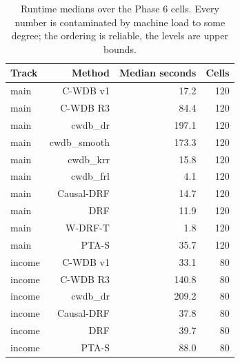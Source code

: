\begin{table}[htbp]
\centering
\caption{Runtime medians over the Phase 6 cells. Every number is contaminated by machine load to some degree; the ordering is reliable, the levels are upper bounds.}
\label{tab:p6-cost}
\small
\begin{tabular}{@{}lrrr@{}}
\toprule
Track & Method & Median seconds & Cells \\ 
\midrule
main & C-WDB v1 & 17.2 & 120 \\ 
main & C-WDB R3 & 84.4 & 120 \\ 
main & cwdb\_dr & 197.1 & 120 \\ 
main & cwdb\_smooth & 173.3 & 120 \\ 
main & cwdb\_krr & 15.8 & 120 \\ 
main & cwdb\_frl & 4.1 & 120 \\ 
main & Causal-DRF & 14.7 & 120 \\ 
main & DRF & 11.9 & 120 \\ 
main & W-DRF-T & 1.8 & 120 \\ 
main & PTA-S & 35.7 & 120 \\ 
income & C-WDB v1 & 33.1 & 80 \\ 
income & C-WDB R3 & 140.8 & 80 \\ 
income & cwdb\_dr & 209.2 & 80 \\ 
income & Causal-DRF & 37.8 & 80 \\ 
income & DRF & 39.7 & 80 \\ 
income & PTA-S & 88.0 & 80 \\ 
\bottomrule
\end{tabular}
\end{table}


